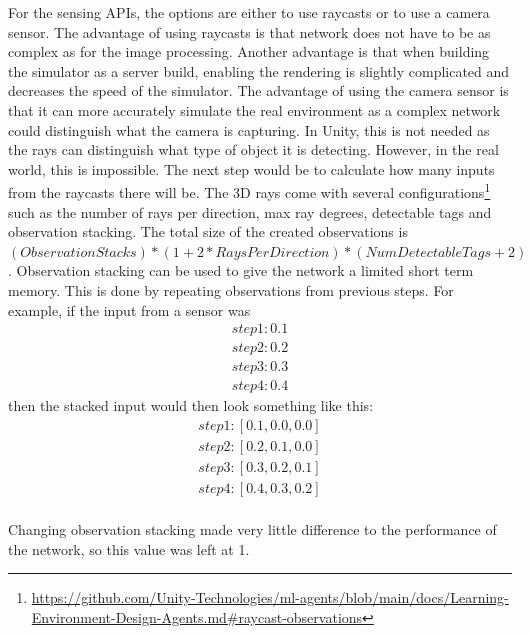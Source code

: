 For the sensing APIs, the options are either to use raycasts or to use a camera sensor. The advantage of using raycasts is that network does not have to be as complex as for the image processing. Another advantage is that when building the simulator as a server build, enabling the rendering is slightly complicated and decreases the speed of the simulator. The advantage of using the camera sensor is that it can more accurately simulate the real environment as a complex network could distinguish what the camera is capturing.  In Unity, this is not needed as the rays can distinguish what type of object it is detecting. However, in the real world, this is impossible. The next step would be to calculate how many inputs from the raycasts there will be. The 3D rays come with several configurations\footnote{\url{https://github.com/Unity-Technologies/ml-agents/blob/main/docs/Learning-Environment-Design-Agents.md#raycast-observations}} such as the number of rays per direction, max ray degrees, detectable tags and observation stacking. The total size of the created observations is $(Observation Stacks) * (1 + 2 * Rays Per Direction) * (Num Detectable Tags + 2)$. Observation stacking can be used to give the network a limited short term memory. This is done by repeating observations from previous steps. For example, if the input from a sensor was
\begin{equation}
  \begin{aligned}
   step 1: 0.1\\
step 2: 0.2\\
step 3: 0.3\\
step 4: 0.4
\end{aligned}
\end{equation}
then the stacked input would then look something like this:
\begin{equation}
  \begin{aligned}
step 1: [0.1, 0.0, 0.0]\\
step 2: [0.2, 0.1, 0.0]\\
step 3: [0.3, 0.2, 0.1]\\
step 4: [0.4, 0.3, 0.2]\\
\end{aligned}
\end{equation}

Changing observation stacking made very little difference to the performance of the network, so this value was left at 1.

